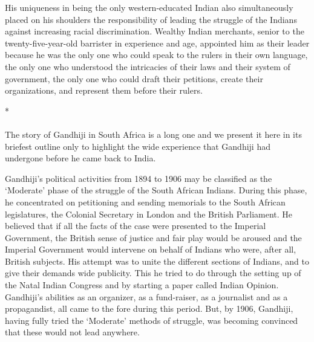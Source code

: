 \begin{multicols}{2}
His uniqueness in being the only western-educated Indian also simultaneously placed on his shoulders the responsibility of leading the struggle of the Indians against increasing racial discrimination. Wealthy Indian merchants, senior to the twenty-five-year-old barrister in experience and age, appointed him as their leader because he was the only one who could speak to the rulers in their own language, the only one who understood the intricacies of their laws and their system of government, the only one who could draft their petitions, create their organizations, and represent them before their rulers.

\begin{center}*\end{center}

\paragraph*{}

The story of Gandhiji in South Africa is a long one and we present it here in its briefest outline only to highlight the wide experience that Gandhiji had undergone before he came back to India.

Gandhiji's political activities from 1894 to 1906 may be classified as the `Moderate' phase of the struggle of the South African Indians. During this phase, he concentrated on petitioning and sending memorials to the South African legislatures, the Colonial Secretary in London and the British Parliament. He believed that if all the facts of the case were presented to the Imperial Government, the British sense of justice and fair play would be aroused and the Imperial Government would intervene on behalf of Indians who were, after all, British subjects. His attempt was to unite the different sections of Indians, and to give their demands wide publicity. This he tried to do through the setting up of the Natal Indian Congress and by starting a paper called Indian Opinion. Gandhiji's abilities as an organizer, as a fund-raiser, as a journalist and as a propagandist, all came to the fore during this period. But, by 1906, Gandhiji, having fully tried the `Moderate' methods of struggle, was becoming convinced that these would not lead anywhere.


\end{multicols}
